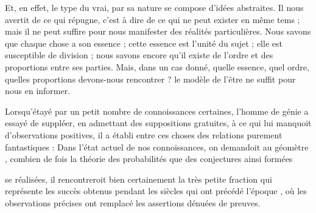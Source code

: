 \documentclass[11pt,a4paper]{article}
\begin{document}
Et, en effet, le type du vrai, par sa nature se compose d'idées
abstraites. Il nous avertit de ce qui répugne, c'est à dire de ce qui ne
peut exister en même tems ; mais il ne peut suffire pour nous manifester
des réalités particulières. Nous savons que chaque chose a son essence ;
cette essence est l'unité du sujet ; elle est susceptible de division ;
nous savons encore qu'il existe de l'ordre et des proportions entre ses
parties. Mais, dans un cas donné, quelle essence, quel ordre, quelles
proportions devons-nous rencontrer ? le modèle de l'être ne suffit pour
nous en informer.

Lorsqu'étayé par un petit nombre de connoissances certaines, l'homme de
génie a essayé de suppléer,  en admettant des suppositions
gratuites, à ce qui lui manquoit d'observations positives, il a établi
entre ces choses des relations purement fantastiques : 
Dans l'état actuel de nos connoissances, on demandoit au géomètre
, combien de
fois la théorie des probabilités  que des conjectures ainsi
formées

se  réalisées, il rencontreroit bien
certainement la très petite fraction qui représente les succès obtenus
pendant les siècles qui ont précédé l'époque , où les observations précises ont remplacé les
assertions dénuées de preuves.

\end{document}
